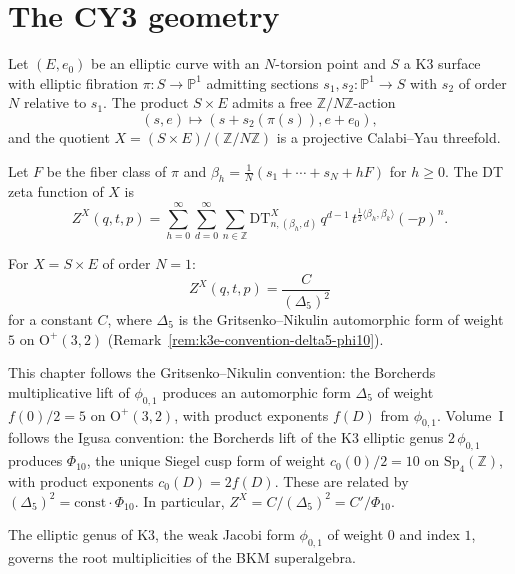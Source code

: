 \section{The CY3 geometry}
\label{sec:k3e-geometry}

Let $(E, e_0)$ be an elliptic curve with an $N$-torsion point and $S$ a K3 surface with elliptic fibration $\pi \colon S \to \mathbb{P}^1$ admitting sections $s_1, s_2 \colon \mathbb{P}^1 \to S$ with $s_2$ of order $N$ relative to $s_1$. The product $S \times E$ admits a free $\mathbb{Z}/N\mathbb{Z}$-action
\[
 (s, e) \longmapsto (s + s_2(\pi(s)), e + e_0),
\]
and the quotient $X = (S \times E)/(\mathbb{Z}/N\mathbb{Z})$ is a projective Calabi--Yau threefold.

\begin{definition}
\label{def:dt-zeta-k3e}
Let $F$ be the fiber class of $\pi$ and $\beta_h = \frac{1}{N}(s_1 + \cdots + s_N + hF)$ for $h \geq 0$. The DT zeta function of $X$ is
\[
 Z^X(q, t, p) = \sum_{h=0}^{\infty} \sum_{d=0}^{\infty} \sum_{n \in \mathbb{Z}} \mathrm{DT}^X_{n,(\beta_h, d)} \, q^{d-1} \, t^{\frac{1}{2}\langle \beta_h, \beta_k \rangle} (-p)^n.
\]
\end{definition}

\begin{theorem}
\label{thm:dt-igusa}
\ClaimStatusProvedElsewhere
For $X = S \times E$ of order $N = 1$:
\[
 Z^X(q, t, p) = \frac{C}{(\Delta_5)^2}
\]
for a constant $C$, where $\Delta_5$ is the Gritsenko--Nikulin automorphic form of weight~$5$ on $\mathrm{O}^+(3,2)$ (Remark~\ref{rem:k3e-convention-delta5-phi10}).
\end{theorem}

\begin{remark}
\label{rem:k3e-convention-delta5-phi10}
This chapter follows the Gritsenko--Nikulin convention: the Borcherds multiplicative lift of $\phi_{0,1}$ produces an automorphic form $\Delta_5$ of weight $f(0)/2 = 5$ on $\mathrm{O}^+(3,2)$, with product exponents $f(D)$ from $\phi_{0,1}$. Volume~I follows the Igusa convention: the Borcherds lift of the K3 elliptic genus $2\,\phi_{0,1}$ produces $\Phi_{10}$, the unique Siegel cusp form of weight $c_0(0)/2 = 10$ on $\mathrm{Sp}_4(\mathbb{Z})$, with product exponents $c_0(D) = 2f(D)$. These are related by $(\Delta_5)^2 = \mathrm{const} \cdot \Phi_{10}$. In particular, $Z^X = C/(\Delta_5)^2 = C'/\Phi_{10}$.
\end{remark}

The elliptic genus of K3, the weak Jacobi form $\phi_{0,1}$ of weight $0$ and index $1$, governs the root multiplicities of the BKM superalgebra.

